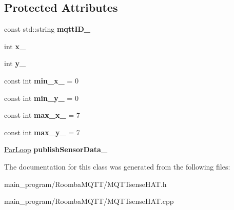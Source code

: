 \subsection*{Protected Attributes}
\begin{DoxyCompactItemize}
\item 
const std\+::string {\bfseries mqtt\+I\+D\+\_\+}\hypertarget{class_m_q_t_tsense_h_a_t_a061227b35a480c89792c4bc44329b1ca}{}\label{class_m_q_t_tsense_h_a_t_a061227b35a480c89792c4bc44329b1ca}

\item 
int {\bfseries x\+\_\+}\hypertarget{class_m_q_t_tsense_h_a_t_a767f72e68bff1bf52e07b66f44ac40c8}{}\label{class_m_q_t_tsense_h_a_t_a767f72e68bff1bf52e07b66f44ac40c8}

\item 
int {\bfseries y\+\_\+}\hypertarget{class_m_q_t_tsense_h_a_t_a608b724d2ab92ed1ea3b3c4c1066961d}{}\label{class_m_q_t_tsense_h_a_t_a608b724d2ab92ed1ea3b3c4c1066961d}

\item 
const int {\bfseries min\+\_\+x\+\_\+} = 0\hypertarget{class_m_q_t_tsense_h_a_t_a6ffe54a927f8c11b396b91049eba7cd0}{}\label{class_m_q_t_tsense_h_a_t_a6ffe54a927f8c11b396b91049eba7cd0}

\item 
const int {\bfseries min\+\_\+y\+\_\+} = 0\hypertarget{class_m_q_t_tsense_h_a_t_a6e45ba7d68af176081550ac1348e0beb}{}\label{class_m_q_t_tsense_h_a_t_a6e45ba7d68af176081550ac1348e0beb}

\item 
const int {\bfseries max\+\_\+x\+\_\+} = 7\hypertarget{class_m_q_t_tsense_h_a_t_aa232cc9b0473918d82b92c6d9a97377a}{}\label{class_m_q_t_tsense_h_a_t_aa232cc9b0473918d82b92c6d9a97377a}

\item 
const int {\bfseries max\+\_\+y\+\_\+} = 7\hypertarget{class_m_q_t_tsense_h_a_t_a2f30b45f01fdb4517ec1b9a047614c67}{}\label{class_m_q_t_tsense_h_a_t_a2f30b45f01fdb4517ec1b9a047614c67}

\item 
\hyperlink{class_par_loop}{Par\+Loop} {\bfseries publish\+Sensor\+Data\+\_\+}\hypertarget{class_m_q_t_tsense_h_a_t_ab9a43131eb5e89aa2a6e26505c74a47c}{}\label{class_m_q_t_tsense_h_a_t_ab9a43131eb5e89aa2a6e26505c74a47c}

\end{DoxyCompactItemize}


The documentation for this class was generated from the following files\+:\begin{DoxyCompactItemize}
\item 
main\+\_\+program/\+Roomba\+M\+Q\+T\+T/M\+Q\+T\+Tsense\+H\+A\+T.\+h\item 
main\+\_\+program/\+Roomba\+M\+Q\+T\+T/M\+Q\+T\+Tsense\+H\+A\+T.\+cpp\end{DoxyCompactItemize}
